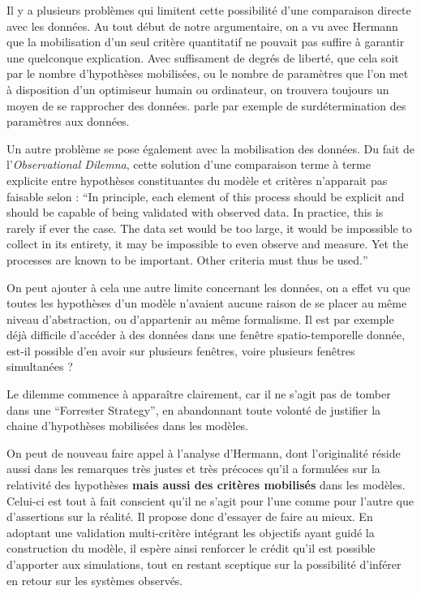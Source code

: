 
Il y a plusieurs problèmes qui limitent cette possibilité d'une comparaison directe avec les données. Au tout début de notre argumentaire, on a vu avec Hermann que la mobilisation d'un seul critère quantitatif ne pouvait pas suffire à garantir une quelconque explication. Avec suffisament de degrés de liberté, que cela soit par le nombre d'hypothèses mobilisées, ou le nombre de paramètres que l'on met à disposition d'un optimiseur humain ou ordinateur, on trouvera toujours un moyen de se rapprocher des données. \textcite[17]{Amblard2006} parle par exemple de surdétermination des paramètres aux données.

Un autre problème se pose également avec la mobilisation des données. Du fait de l'\textit{Observational Dilemna}, cette solution d'une comparaison terme à terme explicite entre hypothèses constituantes du modèle et critères n'apparait pas faisable selon \textcite{Batty2001} : \foreignquote{english}{In principle, each element of this process should be explicit and should be capable of being validated with observed data. In practice, this is rarely if ever the case. The data set would be too large, it would be impossible to collect in its entirety, it may be impossible to even observe and measure. Yet the processes are known to be important. Other criteria must thus be used.} 

On peut ajouter à cela une autre limite concernant les données, on a effet vu que toutes les hypothèses d'un modèle n'avaient aucune raison de se placer au même niveau d'abstraction, ou d'appartenir au même formalisme. Il est par exemple déjà difficile d'accéder à des données dans une fenêtre spatio-temporelle donnée, est-il possible d'en avoir sur plusieurs fenêtres, voire plusieurs fenêtres simultanées ? 

Le dilemme commence à apparaître clairement, car il ne s'agit pas de tomber dans une \foreignquote{english}{Forrester Strategy}, en abandonnant toute volonté de justifier la chaine d'hypothèses mobilisées dans les modèles.

On peut de nouveau faire appel à l'analyse d'Hermann, dont l'originalité réside aussi dans les remarques très justes et très précoces qu'il a formulées sur la relativité des hypothèses \textbf{mais aussi des critères mobilisés} dans les modèles. Celui-ci est tout à fait conscient qu'il ne s'agit pour l'une comme pour l'autre que d'assertions sur la réalité. Il propose donc d'essayer de faire au mieux. En adoptant une validation multi-critère  intégrant les objectifs ayant guidé la construction du modèle, il espère ainsi renforcer le crédit qu'il est possible d'apporter aux simulations, tout en restant sceptique sur la possibilité d'inférer en retour sur les systèmes observés.


